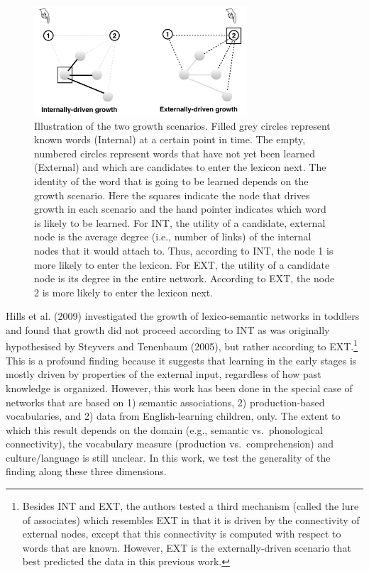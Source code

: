 \documentclass[english,floatsintext,man]{apa6}
\theoremstyle{definition}
\theoremstyle{definition}
\theoremstyle{definition}
\theoremstyle{remark}
\begin{document}
\begin{figure}

{\centering \includegraphics[width=300px]{figs/growth3} 

}

\caption{Illustration of the two growth scenarios. Filled grey circles represent known words (Internal) at a certain point in time. The empty, numbered circles represent words that have not yet been learned (External) and which are candidates to enter the lexicon next. The identity of the word that is going to be learned depends on the growth scenario.  Here the squares indicate the node that drives growth in each scenario and the hand pointer indicates which word is likely to be learned. For INT, the utility of a candidate, external node is the average degree (i.e., number of links) of the internal nodes that it would attach to. Thus, according to INT, the node 1 is more likely to enter the lexicon. For EXT, the utility of a candidate node is its degree in the entire network. According to EXT, the node 2 is more likely to enter the lexicon next.}\label{fig:growth}
\end{figure}

Hills et al. (2009) investigated the growth of lexico-semantic networks
in toddlers and found that growth did not proceed according to INT as
was originally hypothesised by Steyvers and Tenenbaum (2005), but rather
according to
EXT.\footnote{Besides INT and EXT, the authors tested a third mechanism (called the lure of associates) which resembles EXT in that it is driven by the connectivity of external nodes, except that this connectivity is computed with respect to words that are known. However, EXT is the externally-driven scenario that best predicted the data in this previous work.}
This is a profound finding because it suggests that learning in the
early stages is mostly driven by properties of the external input,
regardless of how past knowledge is organized. However, this work has
been done in the special case of networks that are based on 1) semantic
associations, 2) production-based vocabularies, and 2) data from
English-learning children, only. The extent to which this result depends
on the domain (e.g., semantic vs.~phonological connectivity), the
vocabulary measure (production vs.~comprehension) and culture/language
is still unclear. In this work, we test the generality of the finding
along these three dimensions.
\end{document}
